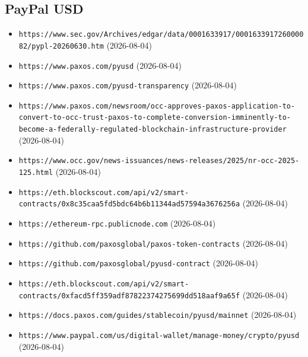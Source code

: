 \subsection*{PayPal USD}
\begin{itemize}\setlength{\itemsep}{0pt}\small
\item \texttt{https://www.sec.gov/Archives/edgar/data/0001633917/000163391726000082/pypl-20260630.htm} (2026-08-04)
\item \texttt{https://www.paxos.com/pyusd} (2026-08-04)
\item \texttt{https://www.paxos.com/pyusd-transparency} (2026-08-04)
\item \texttt{https://www.paxos.com/newsroom/occ-approves-paxos-application-to-convert-to-occ-trust-paxos-to-complete-conversion-imminently-to-become-a-federally-regulated-blockchain-infrastructure-provider} (2026-08-04)
\item \texttt{https://www.occ.gov/news-issuances/news-releases/2025/nr-occ-2025-125.html} (2026-08-04)
\item \texttt{https://eth.blockscout.com/api/v2/smart-contracts/0x8c35caa5fd5bdc64b6b11344ad57594a3676256a} (2026-08-04)
\item \texttt{https://ethereum-rpc.publicnode.com} (2026-08-04)
\item \texttt{https://github.com/paxosglobal/paxos-token-contracts} (2026-08-04)
\item \texttt{https://github.com/paxosglobal/pyusd-contract} (2026-08-04)
\item \texttt{https://eth.blockscout.com/api/v2/smart-contracts/0xfacd5ff359adf87822374275699dd518aaf9a65f} (2026-08-04)
\item \texttt{https://docs.paxos.com/guides/stablecoin/pyusd/mainnet} (2026-08-04)
\item \texttt{https://www.paypal.com/us/digital-wallet/manage-money/crypto/pyusd} (2026-08-04)
\end{itemize}

